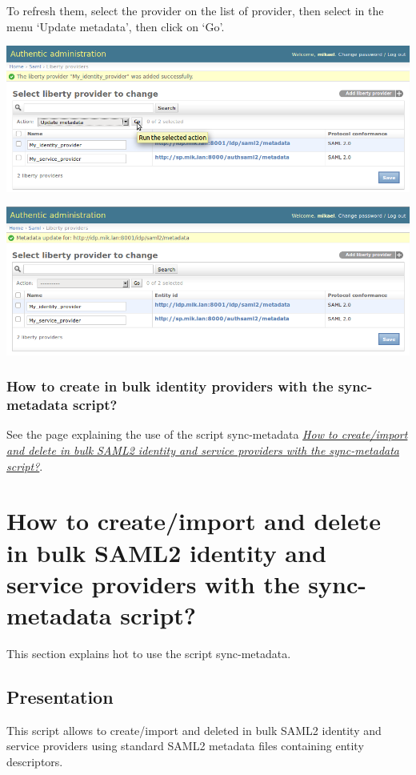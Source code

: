 \documentclass[letterpaper,10pt,english]{sphinxmanual}
\begin{document}
To refresh them, select the provider on the list of provider, then select in
the menu `Update metadata', then click on `Go'.

\includegraphics{update_metadata.png}

\includegraphics{update_metadata_done.png}


\subsubsection{How to create in bulk identity providers with the sync-metadata script?}
\label{config_saml2_idp:how-to-create-in-bulk-identity-providers-with-the-sync-metadata-script}
See the page explaining the use of the script sync-metadata {\hyperref[sync-metadata_script:sync-metadata-script]{\emph{How to create/import and delete in bulk SAML2 identity and service providers with the sync-metadata script?}}}.


\section{How to create/import and delete in bulk SAML2 identity and service providers with the sync-metadata script?}
\label{sync-metadata_script:how-to-create-import-and-delete-in-bulk-saml2-identity-and-service-providers-with-the-sync-metadata-script}\label{sync-metadata_script:sync-metadata-script}\label{sync-metadata_script::doc}
This section explains hot to use the script sync-metadata.


\subsection{Presentation}
\label{sync-metadata_script:presentation}
This script allows to create/import and deleted in bulk SAML2 identity and
service providers using standard SAML2 metadata files containing entity
descriptors.
\end{document}
